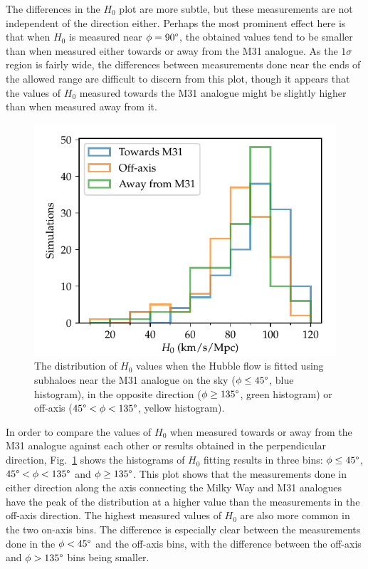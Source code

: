 \documentclass[english, twoside]{HYgradu}
\begin{document}
The differences in the $H_0$ plot are more subtle, but these measurements are not independent of the direction either. Perhaps the most prominent effect here is that when $H_0$ is measured near $\phi = 90\degree$, the obtained values tend to be smaller than when measured either towards or away from the M31 analogue. As the $1 \sigma$ region is fairly wide, the differences between measurements done near the ends of the allowed range are difficult to discern from this plot, though it appears that the values of $H_0$ measured towards the M31 analogue might be slightly higher than when measured away from it.

\begin{figure}
    \centering
    \includegraphics{kuvat/threeDirectionH0.pdf}
    \caption{The distribution of $H_0$ values when the Hubble flow is fitted using subhaloes near the M31 analogue on the sky ($\phi \leq 45 \degree$, blue histogram), in the opposite direction ($\phi \geq 135 \degree$, green histogram) or off-axis ($45 \degree < \phi < 135 \degree$, yellow histogram).}\label{fig:threeDirectionH0}
\end{figure}

In order to compare the values of $H_0$ when measured towards or away from the M31 analogue against each other or results obtained in the perpendicular direction, Fig.~\ref{fig:threeDirectionH0} shows the histograms of $H_0$ fitting results in three bins: $\phi \leq 45 \degree$, $45 \degree < \phi < 135 \degree$ and $\phi \geq 135 \degree$. This plot shows that the measurements done in either direction along the axis connecting the Milky Way and M31 analogues have the peak of the distribution at a higher value than the measurements in the off-axis direction. The highest measured values of $H_0$ are also more common in the two on-axis bins. The difference is especially clear between the measurements done in the $\phi < 45\degree$ and the off-axis bins, with the difference between the off-axis and $\phi > 135\degree$ bins being smaller.
\end{document}

